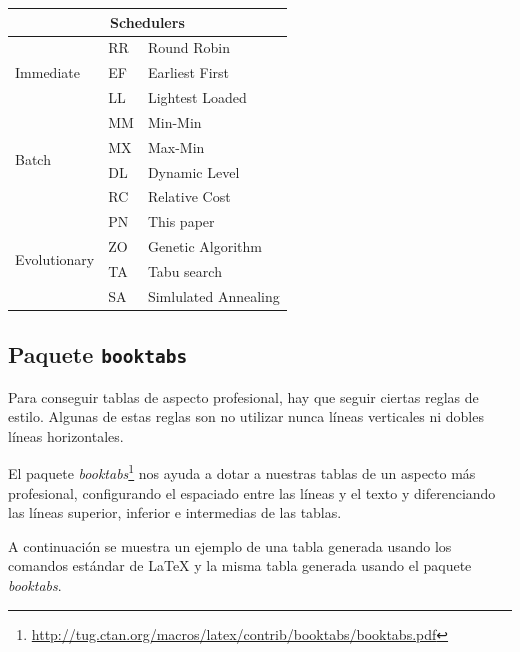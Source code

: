 \documentclass[12pt,a4paper, oneside]{report}
\begin{document}
\begin{tabular}{|l|l|l|} \hline
\multicolumn{3}{|c|}{Schedulers} \\ \hline
\multirow{3}{*}{Immediate} & RR & Round Robin \\
& EF & Earliest First \\
& LL & Lightest Loaded \\ \hline
\multirow{4}{*}{Batch} & MM & Min-Min \\
& MX & Max-Min \\
& DL & Dynamic Level \\
& RC & Relative Cost \\ \hline
\multirow{4}{*}{Evolutionary} & PN & This paper \\
& ZO & Genetic Algorithm\\
& TA & Tabu search\\
& SA & Simlulated Annealing \\ \hline
\end{tabular}

\clearpage
\subsection{Paquete \texttt{booktabs}}

Para conseguir tablas de aspecto profesional, hay que seguir ciertas reglas de estilo. Algunas de estas reglas son no utilizar nunca líneas verticales ni dobles líneas horizontales.

El paquete \textit{booktabs}\footnote{\url{http://tug.ctan.org/macros/latex/contrib/booktabs/booktabs.pdf}} nos ayuda a dotar a nuestras tablas de un aspecto más profesional, configurando el espaciado entre las líneas y el texto y diferenciando las líneas superior, inferior e intermedias de las tablas.

A continuación se muestra un ejemplo de una tabla generada usando los comandos estándar de LaTeX y la misma tabla generada usando el paquete \textit{booktabs}.
\end{document}
